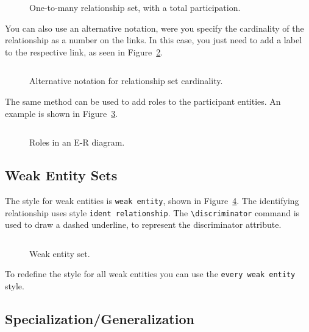 \documentclass[12pt]{article}
\newcommand{\demo}[1]{
  \bigskip
  \begin{minipage}{\linewidth}
      \begin{center}
          
      \end{center}
      \begin{center}
          \scriptsize
          \inputminted{latex}{snippets/#1.tex}
      \end{center}
  \end{minipage}
}
\begin{document}
\begin{figure}[htb!]
    \centering
    \demo{relationship1-M}
    \caption{One-to-many relationship set, with a total participation.}
\label{fig:relationship1-M}
\end{figure}

You can also use an alternative notation, were you specify the cardinality of
the relationship as a number on the links. In this case, you just need to add a
label to the respective link, as seen in Figure~\ref{fig:relationship-card}.

\begin{figure}[htb!]
    \centering
    \demo{relationship-card}
    \caption{Alternative notation for relationship set cardinality.}
\label{fig:relationship-card}
\end{figure}

The same method can be used to add roles to the participant entities. An
example is shown in Figure~\ref{fig:roles}.

\begin{figure}[htb!]
    \centering
    \demo{roles}
    \caption{Roles in an E-R diagram.}
\label{fig:roles}
\end{figure}

\subsection{Weak Entity Sets}
\label{sec:weak-entities}

The style for weak entities is \texttt{weak entity}, shown in
Figure~\ref{fig:weak}. The identifying relationship uses style
\texttt{ident relationship}. The \verb+\discriminator+ command is used to
draw a dashed underline, to represent the discriminator attribute.

\begin{figure}[htb!]
    \centering
    \demo{weak}
    \caption{Weak entity set.}
\label{fig:weak}
\end{figure}

To redefine the style for all weak entities you can use the \texttt{every weak
  entity} style.

%

\subsection{Specialization/Generalization}
\label{sec:spec}
\end{document}
